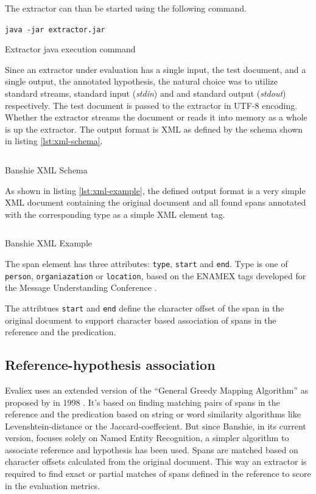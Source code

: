 The extractor can than be started using the following command.

\begin{listing}[H]
\texttt{java -jar extractor.jar}
\caption{Extractor java execution command}
\end{listing}

Since an extractor under evaluation has a single input, the test document, and a single output, the annotated hypothesis, the natural choice was to utilize standard streams, standard input (\textit{stdin}) and and standard output (\textit{stdout}) respectively. The test document is passed to the extractor in UTF-8 encoding. Whether the extractor streams the document or reads it into memory as a whole is up the extractor. The output format is \gls{XML} as defined by the schema shown in listing \ref{lst:xml-schema}.

\begin{listing}[H]
\inputminted{xml}{../../../../../banshie-api/src/main/resources/schema.xsd}
\caption{Banshie XML Schema}
\label{lst:xml-schema}
\end{listing}

As shown in listing \ref{lst:xml-example}, the defined output format is a very simple XML document containing the original document and all found spans annotated with the corresponding type as a simple XML element tag.

\begin{listing}[H]
\inputminted{xml}{../../../../../banshie-api/src/main/resources/example.xml}
\caption{Banshie XML Example}
\label{lst:xml-example}
\end{listing}

The span element has three attributes: \texttt{type}, \texttt{start} and \texttt{end}. Type is one of \texttt{person}, \texttt{organiazation} or \texttt{location}, based on the ENAMEX tags developed for the Message Understanding Conference \cite{Grishman:1996}.

The attribtues \texttt{start} and \texttt{end} define the character offset of the span in the original document to support character based association of spans in the reference and the predication.

\subsection{Reference-hypothesis association}
\label{sec:association}
Evaliex \cite{Linsmayr:2010} uses an extended version of the \enquote{General Greedy Mapping Algorithm} as proposed by \citeauthor{Douthat:1998} in 1998 \cite{Douthat:1998}. It's based on finding matching pairs of spans in the reference and the predication based on string or word similarity algorithms like Levenshtein-distance or the Jaccard-coeffecient. But since Banshie, in its current version, focuses solely on Named Entity Recognition, a simpler algorithm to associate reference and hypothesis has been used. Spans are matched based on character offsets calculated from the original document. This way an extractor is required to find exact or partial matches of spans defined in the reference to score in the evaluation metrics.

